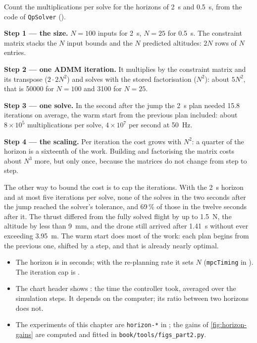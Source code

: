\begin{example}
\label{ex:horizon-flops}
Count the multiplications per solve for the horizons of \SI{2}{s} and \SI{0.5}{s}, from the code of \texttt{QpSolver} ().

\textbf{Step 1 — the size.} $N = 100$ inputs for \SI{2}{s}, $N = 25$ for \SI{0.5}{s}. The constraint matrix stacks the $N$ input bounds and the $N$ predicted altitudes: $2N$ rows of $N$ entries.

\textbf{Step 2 — one ADMM iteration.} It multiplies by the constraint matrix and its transpose ($2 \cdot 2N^2$) and solves with the stored factorisation ($N^2$): about $5N^2$, that is \num{50000} for $N = 100$ and \num{3100} for $N = 25$.

\textbf{Step 3 — one solve.} In the second after the jump the \SI{2}{s} plan needed 15.8 iterations on average, the warm start from the previous plan included: about $8 \times 10^5$ multiplications per solve, $4 \times 10^7$ per second at \SI{50}{Hz}.

\textbf{Step 4 — the scaling.} Per iteration the cost grows with $N^2$: a quarter of the horizon is a sixteenth of the work. Building and factorising the matrix costs about $N^3$ more, but only once, because the matrices do not change from step to step.
\end{example}

The other way to bound the cost is to cap the iterations. With the \SI{2}{s} horizon and at most five iterations per solve, none of the solves in the two seconds after the jump reached the solver's tolerance, and 69\,\% of those in the twelve seconds after it. The thrust differed from the fully solved flight by up to \SI{1.5}{N}, the altitude by less than \SI{9}{mm}, and the drone still arrived after \SI{1.41}{s} without ever exceeding \SI{3.95}{m}. The warm start does most of the work: each plan begins from the previous one, shifted by a step, and that is already nearly optimal.


\begin{inapp}
\begin{itemize}[leftmargin=1.2em]
  \item The horizon is  in seconds; with the re-planning rate  it sets $N$ (\texttt{mpcTiming} in ). The iteration cap is .
  \item The chart header shows : the time the controller took, averaged over the simulation steps. It depends on the computer; its ratio between two horizons does not.
  \item The experiments of this chapter are \texttt{horizon-*} in ; the gains of \cref{fig:horizon-gains} are computed and fitted in \texttt{book/tools/figs\_part2.py}.
\end{itemize}
\end{inapp}

